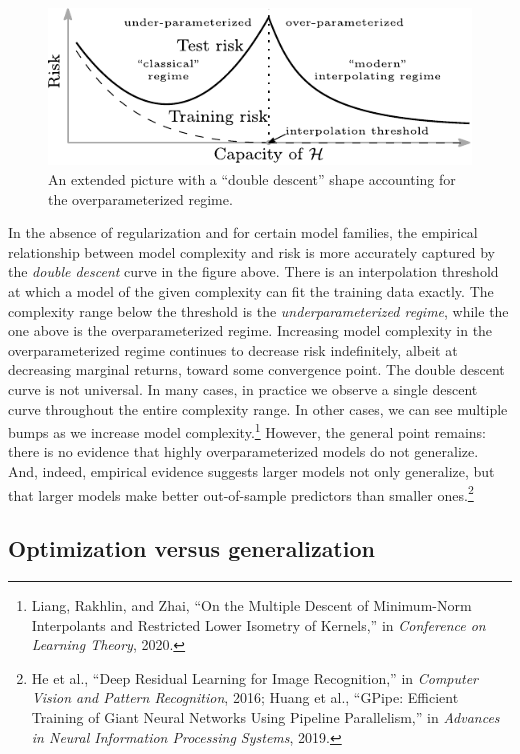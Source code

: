 \documentclass{tufte-book}
\begin{document}
\begin{figure}
\centering
\includegraphics[width=1\textwidth,height=\textheight]{assets/doubledescent}
\caption{An extended picture with a ``double descent'' shape accounting
for the overparameterized regime.}
\end{figure}

In the absence of regularization and for certain model families, the
empirical relationship between model complexity and risk is more
accurately captured by the \emph{double descent} curve in the figure
above. There is an interpolation threshold at which a model of the given
complexity can fit the training data exactly. The complexity range below
the threshold is the \emph{underparameterized regime}, while the one
above is the overparameterized regime. Increasing model complexity in
the overparameterized regime continues to decrease risk indefinitely,
albeit at decreasing marginal returns, toward some convergence point.
The double descent curve is not universal. In many cases, in practice we
observe a single descent curve throughout the entire complexity range.
In other cases, we can see multiple bumps as we increase model
complexity.\footnote{Liang, Rakhlin, and Zhai, {``On the Multiple
  Descent of Minimum-Norm Interpolants and Restricted Lower Isometry of
  Kernels,''} in \emph{Conference on Learning Theory}, 2020.} However,
the general point remains: there is no evidence that highly
overparameterized models do not generalize. And, indeed, empirical
evidence suggests larger models not only generalize, but that larger
models make better out-of-sample predictors than smaller
ones.\footnote{He et al., {``Deep Residual Learning for Image
  Recognition,''} in \emph{Computer Vision and Pattern Recognition},
  2016; Huang et al., {``GPipe: Efficient Training of Giant Neural
  Networks Using Pipeline Parallelism,''} in \emph{Advances in Neural
  Information Processing Systems}, 2019.}

\hypertarget{optimization-versus-generalization}{%
\subsection{Optimization versus
generalization}\label{optimization-versus-generalization}}
\end{document}
